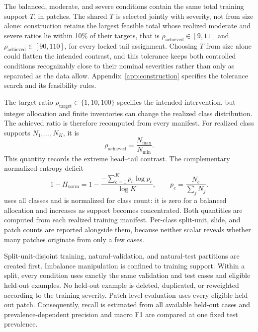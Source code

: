 \documentclass[11pt]{article}
\newcommand{\Hnorm}{1-H_{\mathrm{norm}}}
\begin{document}
\noindent The balanced, moderate, and severe conditions contain the same total training support $T$, in patches. The shared $T$ is selected jointly with severity, not from size alone: construction retains the largest feasible total whose realized moderate and severe ratios lie within 10\% of their targets, that is $\rho_{\mathrm{achieved}}\in[9,11]$ and $\rho_{\mathrm{achieved}}\in[90,110]$, for every locked tail assignment. Choosing $T$ from size alone could flatten the intended contrast, and this tolerance keeps both controlled conditions recognizably close to their nominal severities rather than only as separated as the data allow. Appendix~\ref{app:construction} specifies the tolerance search and its feasibility rules.

The target ratio $\rho_{\mathrm{target}}\in\{1,10,100\}$ specifies the intended intervention, but integer allocation and finite inventories can change the realized class distribution. The achieved ratio is therefore recomputed from every manifest. For realized class supports $N_1,\ldots,N_K$, it is
\begin{equation}
  \rho_{\mathrm{achieved}}=\frac{N_{\max}}{N_{\min}}.
  \label{eq:rho}
\end{equation}
This quantity records the extreme head--tail contrast. The complementary normalized-entropy deficit
\begin{equation}
  \Hnorm=1-\frac{-\sum_{c=1}^{K}p_c\log p_c}{\log K},
  \qquad p_c=\frac{N_c}{\sum_jN_j}.
  \label{eq:entropy}
\end{equation}
\noindent uses all classes and is normalized for class count: it is zero for a balanced allocation and increases as support becomes concentrated. Both quantities are computed from each realized training manifest. Per-class split-unit, slide, and patch counts are reported alongside them, because neither scalar reveals whether many patches originate from only a few cases.

Split-unit-disjoint training, natural-validation, and natural-test partitions are created first. Imbalance manipulation is confined to training support. Within a split, every condition uses exactly the same validation and test cases and eligible held-out examples. No held-out example is deleted, duplicated, or reweighted according to the training severity. Patch-level evaluation uses every eligible held-out patch. Consequently, recall is estimated from all available held-out cases and prevalence-dependent precision and macro F1 are compared at one fixed test prevalence.
\end{document}
